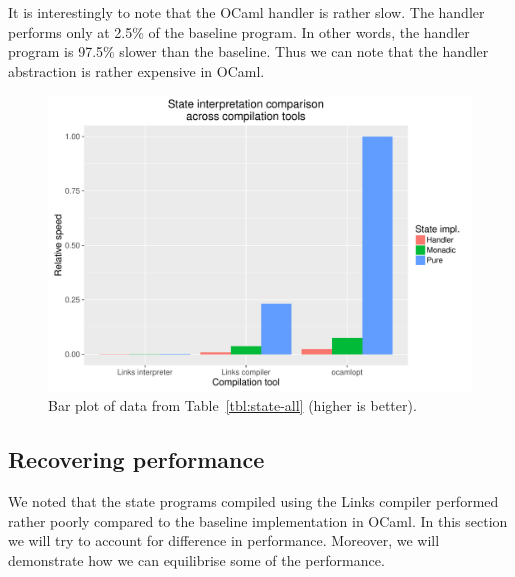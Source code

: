 \documentclass[12pt,mscres,cdtppar,twoside,openright,logo,rightchapter,normalheadings]{infthesis}
\theoremstyle{definition}
\begin{document}
It is interestingly to note that the OCaml handler is rather slow. The
handler performs only at 2.5\% of the baseline program. In other
words, the handler program is 97.5\% slower than the baseline. Thus we
can note that the handler abstraction is rather expensive in OCaml.

\begin{figure}
\centering
\includegraphics[scale=0.6]{plots/stateAll.pdf}
\caption{Bar plot of data from Table~\ref{tbl:state-all} (higher is
  better).}\label{fig:state-all}
\end{figure}


\subsection{Recovering performance}
\label{sec:state-recover}

We noted that the state programs compiled using the Links compiler
performed rather poorly compared to the baseline implementation in
OCaml. In this section we will try to account for difference in
performance. Moreover, we will demonstrate how we can equilibrise some
of the performance.
\end{document}
